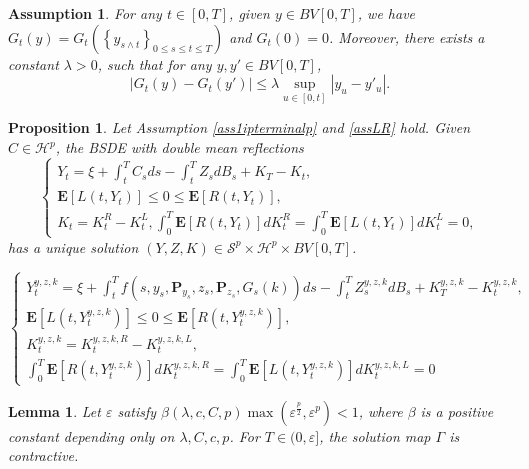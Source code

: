 \documentclass[10pt,a4paper]{amsart}
\newtheorem{assumption}{Assumption}
\newtheorem{proposition}{Proposition}
\newtheorem{lemma}{Lemma}
\def \E{\mathbf{E}}
\def \P{\mathbf{P}}
\begin{document}
\begin{assumption}\label{assgk}
For any $t\in[0,T]$, given $y\in BV[0,T]$,  we have $G_{t}(y)=G_{t}\left ( \left \{ y_{s\wedge t} \right \}_{0\le s\le t\le T}  \right ) $ and  $G_t(0)=0$. Moreover, there exists a constant $\lambda>0$, such that for any $y,y'\in BV[0,T]$,   $$\left | G_{t}(y)-G_t(y') \right | \leq \lambda \sup _{u\in[0,t]}\left | y_u-y'_{u} \right |.$$
\end{assumption}

\begin{proposition}\label{pro-1}
  Let  Assumption \ref{ass1ipterminalp} and \ref{assLR} hold. Given $C\in \mathcal{H}^p$, the BSDE with double mean reflections 
   \begin{equation}\label{MFBSDEC}
   \begin{cases}
Y_t=\xi+\int_t^T C_s ds-\int_t^T Z_s dB_s+K_T-K_t, \\
\E[L(t,Y_t)]\leq 0\leq \E[R(t,Y_t)], \\
K_t=K^{R}_t-K^{L}_t, \int_0^T \E[R(t,Y_t)]dK_t^{R}=\int_0^T \E[L(t,Y_t)]dK^{L}_t=0,
\end{cases}
\end{equation}
has a unique solution $\left(Y,Z,K\right)\in \mathcal{S}^p\times\mathcal{H}^{p}\times BV[0,T]$.
\end{proposition}

\begin{equation}\label{yzk}
\begin{cases}
Y_t^{y,z,k}=\xi+\int_t^T f(s,y_s,\P_{y_s},z_s,\P_{z_s}, G_s(k))ds-\int_t^T Z_s^{y,z,k} dB_s+K_T^{y,z,k}-K_t^{y,z,k}, \\
\E[L(t,Y_t^{y,z,k})]\leq 0\leq \E[R(t,Y_t^{y,z,k})], \\
K^{y,z,k}_t=K^{y,z,k,R}_t-K^{y,z,k,L}_t, \\
\int_0^T \E[R(t,Y_t^{y,z,k})]dK_t^{y,z,k,R}=\int_0^T \E[L(t,Y_t^{y,z,k})]dK^{y,z,k,L}_t=0
\end{cases}
\end{equation}

\begin{lemma}\label{le3-2}
Let $\varepsilon$ satisfy $\beta(\lambda,c,C,p)\max\left(\varepsilon^{\frac{p}{2}},\varepsilon^p\right)<1$, where $\beta$ is a positive constant depending only on $\lambda, C,c,p$. For $T\in (0,\varepsilon]$, the solution map $\Gamma$ is contractive. 
\end{lemma}
\end{document}
